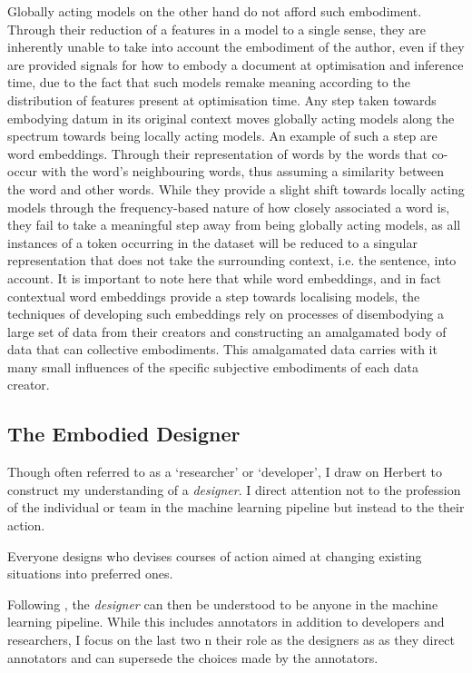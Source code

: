 {Globally acting models on the other hand do not afford such embodiment.
Through their reduction of a features in a model to a single sense, they are inherently unable to take into account the embodiment of the author, even if they are provided signals for how to embody a document at optimisation and inference time, due to the fact that such models remake meaning according to the distribution of features present at optimisation time.
Any step taken towards embodying datum in its original context moves globally acting models along the spectrum towards being locally acting models.
An example of such a step are word embeddings.
Through their representation of words by the words that co-occur with the word's neighbouring words, thus assuming a similarity between the word and other words.
While they provide a slight shift towards locally acting models through the frequency-based nature of how closely associated a word is, they fail to take a meaningful step away from being globally acting models, as all instances of a token occurring in the dataset will be reduced to a singular representation that does not take the surrounding context, i.e. the sentence, into account.
It is important to note here that while word embeddings, and in fact contextual word embeddings provide a step towards localising models, the techniques of developing such embeddings rely on processes of disembodying a large set of data from their creators and constructing an amalgamated body of data that can collective embodiments.
This amalgamated data carries with it many small influences of the specific subjective embodiments of each data creator.

\subsection{The Embodied Designer}
Though often referred to as a `researcher' or `developer', I draw on Herbert \citet{Simon:1969} to construct my understanding of a \textit{designer}.
I direct attention not to the profession of the individual or team in the machine learning pipeline but instead to the their action.

\begin{citequote}{\citep[p. 111]{Simon:1969}}
  Everyone designs who devises courses of action aimed at changing existing situations into preferred ones.
\end{citequote}

Following \citet{Simon:1969}, the \textit{designer} can then be understood to be anyone in the machine learning pipeline.
While this includes annotators in addition to developers and researchers, I focus on the last two n their role as the designers as as they direct annotators and can supersede the choices made by the annotators.

}
